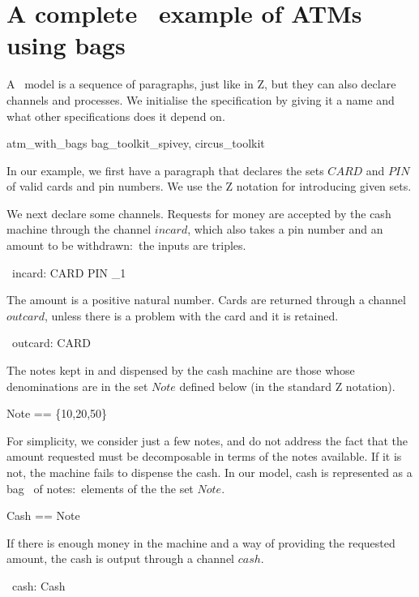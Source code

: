 \documentclass{article}
\begin{document}
\section{A complete \Circus\ example of ATMs using bags}
\label{section:circus-notation}

A \Circus\ model is a sequence of paragraphs, just like in Z, but
they can also declare channels and processes. We initialise the
specification by giving it a name and what other specifications
does it depend on.
\begin{zsection}
  \SECTION atm\_with\_bags \parents bag\_toolkit\_spivey, circus\_toolkit
\end{zsection}

In our example, we first have a paragraph that declares the sets
$CARD$ and $PIN$ of valid cards and pin numbers.  We use the Z
notation for introducing given sets.
\begin{zed}
\end{zed}
We next declare some channels.  Requests for money are accepted by
the cash machine through the channel $incard$, which also takes a pin
number and an amount to be withdrawn:~the inputs are triples.
\begin{circus}
  \circchannel\ incard: CARD \cross PIN \cross \nat_1
\end{circus}
The amount is a positive natural number.  Cards are returned through
a channel $outcard$, unless there is a problem with the card and it
is retained.
\begin{circus}
  \circchannel\ outcard: CARD
\end{circus}
The notes kept in and dispensed by the cash machine are those whose
denominations are in the set $Note$ defined below (in the standard Z
notation).
\begin{zed}
  Note == \{10,20,50\}
\end{zed}
For simplicity, we consider just a few notes, and do not address the
fact that the amount requested must be decomposable in terms of the
notes available.  If it is not, the machine fails to dispense the
cash. In our model, cash is represented as a bag~\cite{Spi92} of
notes:~elements of the the set $Note$.
\begin{zed}
  Cash == \bag Note
\end{zed}
If there is enough money in the machine and a way of providing the
requested amount, the cash is output through a channel $cash$.
\begin{circus}
  \circchannel\ cash: Cash
\end{circus}
\end{document}
